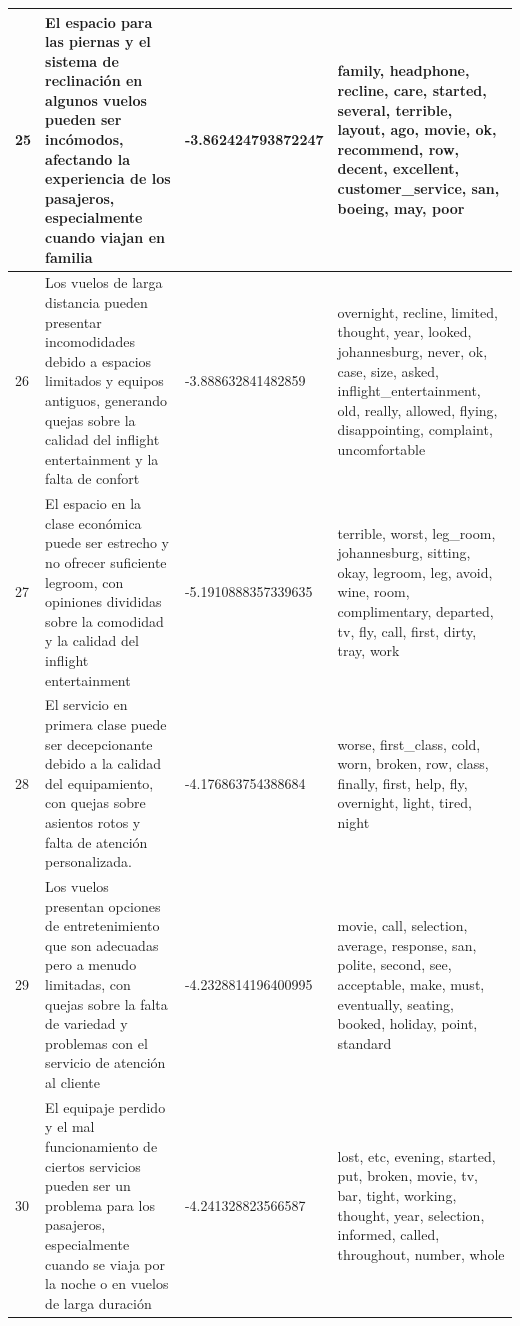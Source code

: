 \documentclass{report}
\begin{document}
\begin{longtable}{|p{1cm}|p{4cm}|p{4cm}|p{6cm}|}
                    \hline
                    25 & El espacio para las piernas y el sistema de reclinación en algunos vuelos pueden ser incómodos, afectando la experiencia de los pasajeros, especialmente cuando viajan en familia & -3.862424793872247 & family, headphone, recline, care, started, several, terrible, layout, ago, movie, ok, recommend, row, decent, excellent, customer\_service, san, boeing, may, poor \\
                    \hline
                    26 & Los vuelos de larga distancia pueden presentar incomodidades debido a espacios limitados y equipos antiguos, generando quejas sobre la calidad del inflight entertainment y la falta de confort & -3.888632841482859 & overnight, recline, limited, thought, year, looked, johannesburg, never, ok, case, size, asked, inflight\_entertainment, old, really, allowed, flying, disappointing, complaint, uncomfortable \\
                    \hline
                    27 & El espacio en la clase económica puede ser estrecho y no ofrecer suficiente legroom, con opiniones divididas sobre la comodidad y la calidad del inflight entertainment & -5.1910888357339635 & terrible, worst, leg\_room, johannesburg, sitting, okay, legroom, leg, avoid, wine, room, complimentary, departed, tv, fly, call, first, dirty, tray, work \\
                    \hline
                    28 & El servicio en primera clase puede ser decepcionante debido a la calidad del equipamiento, con quejas sobre asientos rotos y falta de atención personalizada. & -4.176863754388684 & worse, first\_class, cold, worn, broken, row, class, finally, first, help, fly, overnight, light, tired, night \\
                    \hline
                    29 & Los vuelos presentan opciones de entretenimiento que son adecuadas pero a menudo limitadas, con quejas sobre la falta de variedad y problemas con el servicio de atención al cliente & -4.2328814196400995 & movie, call, selection, average, response, san, polite, second, see, acceptable, make, must, eventually, seating, booked, holiday, point, standard \\
                    \hline
                    30 & El equipaje perdido y el mal funcionamiento de ciertos servicios pueden ser un problema para los pasajeros, especialmente cuando se viaja por la noche o en vuelos de larga duración & -4.241328823566587 & lost, etc, evening, started, put, broken, movie, tv, bar, tight, working, thought, year, selection, informed, called, throughout, number, whole \\

\end{longtable}
\end{document}

